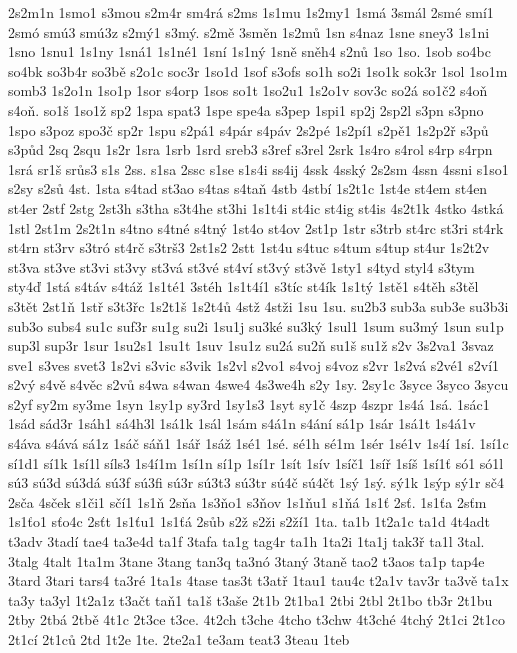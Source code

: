2s2m1n
1smo1
s3mou
s2m4r
sm4rá
s2ms
1s1mu
1s2my1
1smá
3smál
2smé
smí1
2smó
smú3
smú3z
s2mý1
s3mý.
s2mě
3směn
1s2mů
1sn
s4naz
1sne
sney3
1s1ni
1sno
1snu1
1s1ny
1sná1
1s1né1
1sní
1s1ný
1sně
sněh4
s2nů
1so
1so.
1sob
so4bc
so4bk
so3b4r
so3bě
s2o1c
soc3r
1so1d
1sof
s3ofs
so1h
so2i
1so1k
sok3r
1sol
1so1m
somb3
1s2o1n
1so1p
1sor
s4orp
1sos
so1t
1so2u1
1s2o1v
sov3c
so2á
so1č2
s4oň
s4oň.
so1š
1so1ž
sp2
1spa
spat3
1spe
spe4a
s3pep
1spi1
sp2j
2sp2l
s3pn
s3pno
1spo
s3poz
spo3č
sp2r
1spu
s2pá1
s4pár
s4páv
2s2pé
1s2pí1
s2pě1
1s2p2ř
s3pů
s3půd
2sq
2squ
1s2r
1sra
1srb
1srd
sreb3
s3ref
s3rel
2srk
1s4ro
s4rol
s4rp
s4rpn
1srá
sr1š
srůs3
s1s
2ss.
s1sa
2ssc
s1se
s1s4i
ss4ij
4ssk
4sský
2s2sm
4ssn
4ssni
s1so1
s2sy
s2sů
4st.
1sta
s4tad
st3ao
s4tas
s4taň
4stb
4stbí
1s2t1c
1st4e
st4em
st4en
st4er
2stf
2stg
2st3h
s3tha
s3t4he
st3hi
1s1t4i
st4ic
st4ig
st4is
4s2t1k
4stko
4stká
1stl
2st1m
2s2t1n
s4tno
s4tné
s4tný
1st4o
st4ov
2st1p
1str
s3trb
st4rc
st3ri
st4rk
st4rn
st3rv
s3tró
st4rč
s3trš3
2st1s2
2stt
1st4u
s4tuc
s4tum
s4tup
st4ur
1s2t2v
st3va
st3ve
st3vi
st3vy
st3vá
st3vé
st4ví
st3vý
st3vě
1sty1
s4tyd
styl4
s3tym
sty4ď
1stá
s4táv
s4táž
1s1té1
3stéh
1s1t4í1
s3tíc
st4ík
1s1tý
1stě1
s4těh
s3těl
s3tět
2st1ň
1stř
s3t3řc
1s2t1š
1s2t4ů
4stž
4stži
1su
1su.
su2b3
sub3a
sub3e
su3b3i
sub3o
subs4
su1c
suf3r
su1g
su2i
1su1j
su3ké
su3ký
1sul1
1sum
su3mý
1sun
su1p
sup3l
sup3r
1sur
1su2s1
1su1t
1suv
1su1z
su2á
su2ň
su1š
su1ž
s2v
3s2va1
3svaz
sve1
s3ves
svet3
1s2vi
s3vic
s3vik
1s2vl
s2vo1
s4voj
s4voz
s2vr
1s2vá
s2vé1
s2ví1
s2vý
s4vě
s4věc
s2vů
s4wa
s4wan
4swe4
4s3we4h
s2y
1sy.
2sy1c
3syce
3syco
3sycu
s2yf
sy2m
sy3me
1syn
1sy1p
sy3rd
1sy1s3
1syt
sy1č
4szp
4szpr
1s4á
1sá.
1sác1
1sád
sád3r
1sáh1
sá4h3l
1sá1k
1sál
1sám
s4á1n
s4ání
sá1p
1sár
1sá1t
1s4á1v
s4áva
s4ává
sá1z
1sáč
sáň1
1sář
1sáž
1sé1
1sé.
sé1h
sé1m
1sér
1sé1v
1s4í
1sí.
1sí1c
sí1d1
sí1k
1sí1l
síls3
1s4í1m
1sí1n
sí1p
1sí1r
1sít
1sív
1síč1
1síř
1síš
1sí1ť
só1
só1l
sú3
sú3d
sú3dá
sú3f
sú3fi
sú3r
sú3t3
sú3tr
sú4č
sú4čt
1sý
1sý.
sý1k
1sýp
sý1r
sč4
2sča
4sček
s1či1
sčí1
1s1ň
2sňa
1s3ňo1
s3ňov
1s1ňu1
s1ňá
1s1ť
2sť.
1s1ťa
2sťm
1s1ťo1
sťo4c
2sťt
1s1ťu1
1s1ťá
2sůb
s2ž
s2ži
s2ží1
1ta.
ta1b
1t2a1c
ta1d
4t4adt
t3adv
3tadí
tae4
ta3e4d
ta1f
3tafa
ta1g
tag4r
ta1h
1ta2i
1ta1j
tak3ř
ta1l
3tal.
3talg
4talt
1ta1m
3tane
3tang
tan3q
ta3nó
3taný
3taně
tao2
t3aos
ta1p
tap4e
3tard
3tari
tars4
ta3ré
1ta1s
4tase
tas3t
t3atř
1tau1
tau4c
t2a1v
tav3r
ta3vě
ta1x
ta3y
ta3yl
1t2a1z
t3ačt
taň1
ta1š
t3aše
2t1b
2t1ba1
2tbi
2tbl
2t1bo
tb3r
2t1bu
2tby
2tbá
2tbě
4t1c
2t3ce
t3ce.
4t2ch
t3che
4tcho
t3chw
4t3ché
4tchý
2t1ci
2t1co
2t1cí
2t1ců
2td
1t2e
1te.
2te2a1
te3am
teat3
3teau
1teb
